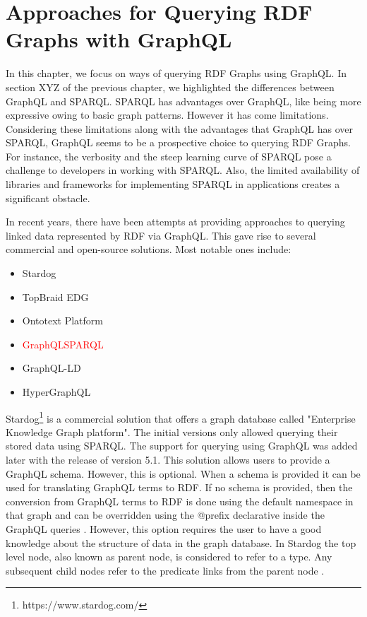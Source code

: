\chapter{Approaches for Querying RDF Graphs with GraphQL}

In this chapter, we focus on ways of querying RDF Graphs using GraphQL. In section XYZ of the previous chapter, we highlighted the differences between GraphQL and SPARQL. SPARQL has advantages over GraphQL, like being more expressive owing to basic graph patterns. However it has come limitations. Considering these limitations along with the advantages that GraphQL has over SPARQL, GraphQL seems to be a prospective choice to querying RDF Graphs. For instance, the verbosity and the steep learning curve of SPARQL pose a challenge to developers in working with SPARQL. Also, the limited availability of libraries and frameworks for implementing SPARQL in applications creates a significant obstacle. 


In recent years, there have been attempts at providing approaches to querying linked data represented by RDF via GraphQL. This gave rise to several commercial and open-source solutions. Most notable ones include:

\begin{itemize}
	\item Stardog
	\item TopBraid EDG
	\item Ontotext Platform
	\item \textcolor{red}{GraphQLSPARQL} 
	\item GraphQL-LD
	\item HyperGraphQL

\end{itemize}

Stardog\footnote{https://www.stardog.com/} is a commercial solution that offers a graph database called "Enterprise Knowledge Graph platform"\cite{Angele2022}. The initial versions only allowed querying their stored data using SPARQL. The support for querying using GraphQL was added later with the release of version 5.1. This solution allows users to provide a GraphQL schema. However, this is optional. When a schema is provided it can be used for translating GraphQL terms to RDF. If no schema is provided, then the conversion from GraphQL terms to RDF is done using the default namespace in that graph and can be overridden using the @prefix declarative inside the GraphQL queries \cite{Taelman2019}. However, this option requires the user to have a good knowledge about the structure of data in the graph database. In Stardog the top level node, also known as parent node, is considered to refer to a type. Any subsequent child nodes refer to the predicate links from the parent node \cite{Taelman2019}.

